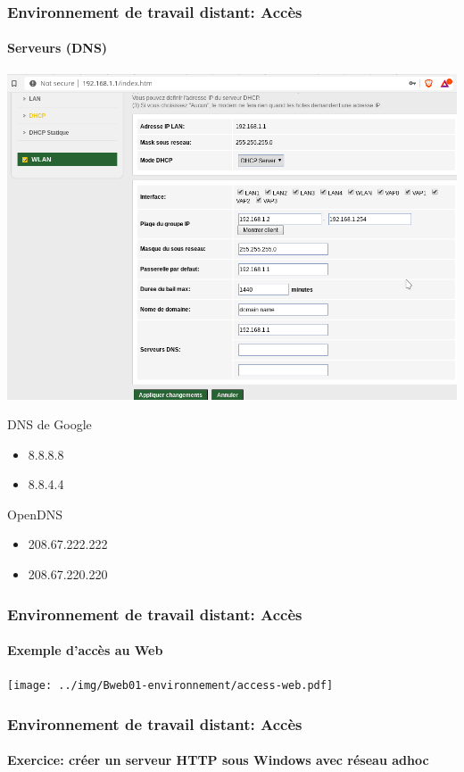 \documentclass[xcolor=table]{beamer}
\begin{document}
\begin{frame}
\frametitle{Environnement de travail distant: Accès}
\framesubtitle{Serveurs (DNS)}

\begin{minipage}{0.65\textwidth}
	\includegraphics[width=\textwidth]{../img/Bweb01-environnement/dns.png}
\end{minipage}
%
\begin{minipage}{0.30\textwidth}
	DNS de Google
	\begin{itemize}
		\item 8.8.8.8
		\item 8.8.4.4
	\end{itemize}

	OpenDNS
	\begin{itemize}
		\item 208.67.222.222
		\item 208.67.220.220
	\end{itemize}

\end{minipage}

\end{frame}

\begin{frame}
\frametitle{Environnement de travail distant: Accès}
\framesubtitle{Exemple d'accès au Web}

\texttt{[image: ../img/Bweb01-environnement/access-web.pdf]}

\end{frame}


\begin{frame}
\frametitle{Environnement de travail distant: Accès}
\framesubtitle{Exercice: créer un serveur HTTP sous Windows avec réseau adhoc}




\end{frame}
\end{document}
